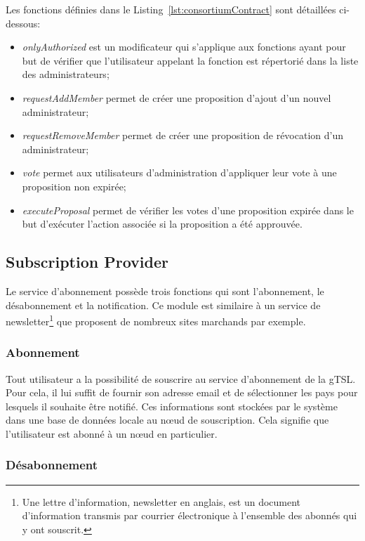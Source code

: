 \documentclass{tnreport}
\begin{document}
Les fonctions définies dans le Listing~\ref{lst:consortiumContract} sont détaillées ci-dessous:
\begin{itemize}
	\item \textit{onlyAuthorized} est un modificateur qui s'applique aux fonctions ayant pour but de vérifier que l'utilisateur appelant la fonction est répertorié dans la liste des administrateurs;
	\item \textit{requestAddMember} permet de créer une proposition d'ajout d'un nouvel administrateur;
	\item \textit{requestRemoveMember} permet de créer une proposition de révocation d'un administrateur;
	\item \textit{vote} permet aux utilisateurs d'administration d'appliquer leur vote à une proposition non expirée;
	\item \textit{executeProposal} permet de vérifier les votes d'une proposition expirée dans le but d'exécuter l'action associée si la proposition a été approuvée.
\end{itemize}

\subsection{Subscription Provider}

Le service d'abonnement possède trois fonctions qui sont l'abonnement, le désabonnement et la notification. Ce module est similaire à un service de newsletter\footnote{Une lettre d'information, newsletter en anglais, est un document d'information transmis par courrier électronique à l'ensemble des abonnés qui y ont souscrit.} que proposent de nombreux sites marchands par exemple.

\subsubsection{Abonnement}

Tout utilisateur a la possibilité de souscrire au service d'abonnement de la gTSL. Pour cela, il lui suffit de fournir son adresse email et de sélectionner les pays pour lesquels il souhaite être notifié. Ces informations sont stockées par le système dans une base de données locale au nœud de souscription. Cela signifie que l'utilisateur est abonné à un nœud en particulier.

\subsubsection{Désabonnement}
\end{document}

